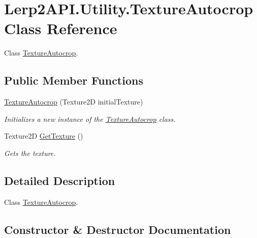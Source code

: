 \hypertarget{class_lerp2_a_p_i_1_1_utility_1_1_texture_autocrop}{}\section{Lerp2\+A\+P\+I.\+Utility.\+Texture\+Autocrop Class Reference}
\label{class_lerp2_a_p_i_1_1_utility_1_1_texture_autocrop}


Class \hyperlink{class_lerp2_a_p_i_1_1_utility_1_1_texture_autocrop}{Texture\+Autocrop}.  


\subsection*{Public Member Functions}
\begin{DoxyCompactItemize}
\item 
\hyperlink{class_lerp2_a_p_i_1_1_utility_1_1_texture_autocrop_ae377d30d28f10ebd128dfccd0ac96c67}{Texture\+Autocrop} (Texture2D initial\+Texture)
\begin{DoxyCompactList}\small\item\em Initializes a new instance of the \hyperlink{class_lerp2_a_p_i_1_1_utility_1_1_texture_autocrop}{Texture\+Autocrop} class. \end{DoxyCompactList}\item 
Texture2D \hyperlink{class_lerp2_a_p_i_1_1_utility_1_1_texture_autocrop_a0732af109b4214f9b7afb341d42c7735}{Get\+Texture} ()
\begin{DoxyCompactList}\small\item\em Gets the texture. \end{DoxyCompactList}\end{DoxyCompactItemize}


\subsection{Detailed Description}
Class \hyperlink{class_lerp2_a_p_i_1_1_utility_1_1_texture_autocrop}{Texture\+Autocrop}. 



\subsection{Constructor \& Destructor Documentation}
\mbox{\label{class_lerp2_a_p_i_1_1_utility_1_1_texture_autocrop_ae377d30d28f10ebd128dfccd0ac96c67}} 
